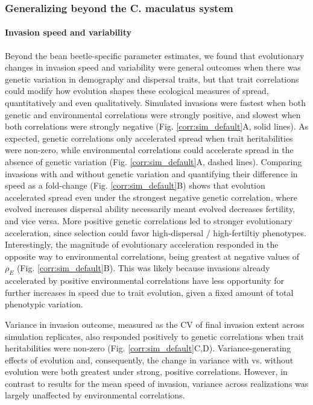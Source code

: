 \documentclass[11pt]{article}
\begin{document}
\subsubsection*{Generalizing beyond the \textup{C. maculatus} system}
\paragraph{Invasion speed and variability}
Beyond the bean beetle-specific parameter estimates, we found that evolutionary changes in invasion speed and variability were general outcomes when there was genetic variation in demography and dispersal traits, but that trait correlations could modify how evolution shapes these ecological measures of spread, quantitatively and even qualitatively.
Simulated invasions were fastest when both genetic and environmental correlations were strongly positive, and slowest when both correlations were strongly negative (Fig. \ref{corr:sim_default}A, solid lines).
As expected, genetic correlations only accelerated spread when trait heritabilities were non-zero, while environmental correlations could accelerate spread in the absence of genetic variation (Fig. \ref{corr:sim_default}A, dashed lines).
Comparing invasions with and without genetic variation and quantifying their difference in speed as a fold-change (Fig. \ref{corr:sim_default}B) shows that evolution accelerated spread even under the strongest negative genetic correlation, where evolved increases dispersal ability necessarily meant evolved decreases fertility, and vice versa.
More positive genetic correlations led to stronger evolutionary acceleration, since selection could favor high-dispersal / high-fertiltiy phenotypes.
Interestingly, the magnitude of evolutionary acceleration responded in the opposite way to environmental correlations, being greatest at negative values of $\rho_{E}$ (Fig. \ref{corr:sim_default}B).
This was likely because invasions already accelerated by positive environmental correlations have less opportunity for further increases in speed due to trait evolution, given a fixed amount of total phenotypic variation.

Variance in invasion outcome, measured as the CV of final invasion extent across simulation replicates, also responded positively to genetic correlations when trait heritabilities were non-zero (Fig. \ref{corr:sim_default}C,D).
Variance-generating effects of evolution and, consequently, the change in variance with vs. without evolution were both greatest under strong, positive correlations.
However, in contrast to results for the mean speed of invasion, variance across realizations was largely unaffected by environmental correlations.
\end{document}
